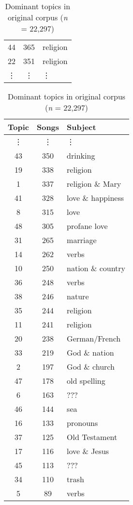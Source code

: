 \begin{table}
\begin{minipage}{0.5\textwidth}
\begin{tabular}{ccl}
			44             &   365 & religion \\
			22             &   351 & religion \\
			\vdots & \vdots & \vdots \\
			\bottomrule
		\end{tabular}
	\end{minipage} \hfill
	\begin{minipage}{0.5\textwidth}
		\begin{tabular}{|ccl}
			\toprule
			Topic & Songs & Subject \\
			\midrule
			\vdots & \vdots &\vdots \\
			
			43             &   350 & drinking \\
			19             &   338 & religion \\
			1              &   337 & religion \& Mary \\
			41             &   328 & love \& happiness \\
			8              &   315 & love \\
			48             &   305 & profane love \\
			31             &   265 & marriage \\
			14             &   262 & verbs \\
			10             &   250 & nation \& country \\
			36             &   248 & verbs \\
			38             &   246 & nature \\
			35             &   244 & religion \\
			11             &   241 & religion \\
			20             &   238 & German/French \\
			33             &   219 & God \& nation \\
			2              &   197 & God \& church \\
			47             &   178 & old spelling \\
			6              &   163 & ??? \\
			46             &   144 & sea \\
			16             &   133 & pronouns \\
			37             &   125 & Old Testament \\
			17             &   116 & love \& Jesus \\
			45             &   113 & ??? \\
			34             &   110 & trash \\
			5              &    89 & verbs \\
			\bottomrule
		\end{tabular}
	\end{minipage}
	\caption{Dominant topics in original corpus (\textit{n} = 22,297)}
	\label{table:DomTopOr}
\end{table}

